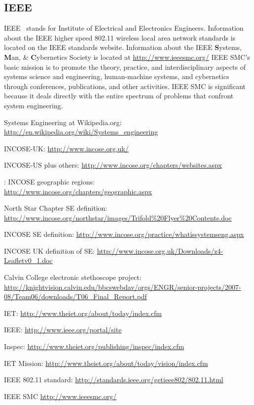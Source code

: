 \documentclass[a4paper,12pt]{article}
\begin{document}
\subsection{IEEE}
IEEE~\cite{IEEE} stands for Institute of Electrical and Electronics Engineers.  Information about the IEEE higher speed 802.11 wireless local area network standards is located on the IEEE standards website\cite{802.11}.  Information about the IEEE {\bf S}ystems, {\bf M}an, \& {\bf C}ybernetics Society is located at \url{http://www.ieeesmc.org/}\cite{ieeesmc}  IEEE SMC's basic mission is to promote the theory, practice, and interdisciplinary aspects of systems science and engineering, human-machine systems, and cybernetics through conferences, publications, and other activities.  IEEE SMC is significant because it deals directly with the entire spectrum of problems that confront system engineering.



\newpage
{}
\begin{thebibliography}{100}
	
 Systems Engineering at Wikipedia.org: \url{http://en.wikipedia.org/wiki/Systems_engineering}

 INCOSE-UK: \url{http://www.incose.org.uk/}

 INCOSE-US plus others: \url{http://www.incose.org/chapters/websites.aspx}

: INCOSE geographic regions:\\
\url{http://www.incose.org/chapters/geographic.aspx}

 North Star Chapter SE definition: \url{http://www.incose.org/northstar/images/Trifold%20Flyer%20Contents.doc}

 INCOSE SE definition: \url{http://www.incose.org/practice/whatissystemseng.aspx}

 INCOSE UK definition of SE: \url{http://www.incose.org.uk/Downloads/z4-Leafletv0_1.doc}

 Calvin College electronic stethoscope project: \url{http://knightvision.calvin.edu/bbcswebdav/orgs/ENGR/senior-projects/2007-08/Team06/downloads/T06_Final_Report.pdf}

 IET: \url{http://www.theiet.org/about/today/index.cfm}

 IEEE: \url{http://www.ieee.org/portal/site}

 Inspec: \url{http://www.theiet.org/publishing/inspec/index.cfm}

 IET Mission: \url{http://www.theiet.org/about/today/vision/index.cfm}

 IEEE 802.11 standard: \url{http://standards.ieee.org/getieee802/802.11.html}

 IEEE SMC \url{http://www.ieeesmc.org/}

\end{thebibliography}
\end{document}
